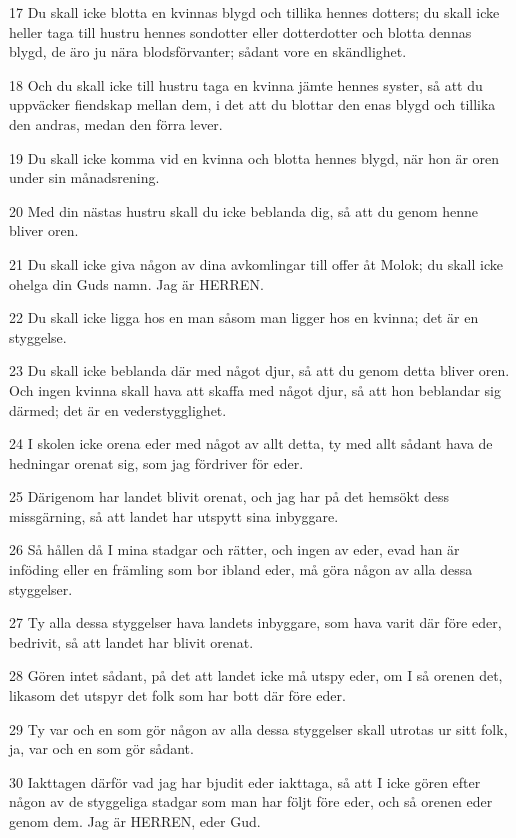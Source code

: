 \par 17 Du skall icke blotta en kvinnas blygd och tillika hennes dotters; du skall icke heller taga till hustru hennes sondotter eller dotterdotter och blotta dennas blygd, de äro ju nära blodsförvanter; sådant vore en skändlighet.
\par 18 Och du skall icke till hustru taga en kvinna jämte hennes syster, så att du uppväcker fiendskap mellan dem, i det att du blottar den enas blygd och tillika den andras, medan den förra lever.
\par 19 Du skall icke komma vid en kvinna och blotta hennes blygd, när hon är oren under sin månadsrening.
\par 20 Med din nästas hustru skall du icke beblanda dig, så att du genom henne bliver oren.
\par 21 Du skall icke giva någon av dina avkomlingar till offer åt Molok; du skall icke ohelga din Guds namn. Jag är HERREN.
\par 22 Du skall icke ligga hos en man såsom man ligger hos en kvinna; det är en styggelse.
\par 23 Du skall icke beblanda där med något djur, så att du genom detta bliver oren. Och ingen kvinna skall hava att skaffa med något djur, så att hon beblandar sig därmed; det är en vederstygglighet.
\par 24 I skolen icke orena eder med något av allt detta, ty med allt sådant hava de hedningar orenat sig, som jag fördriver för eder.
\par 25 Därigenom har landet blivit orenat, och jag har på det hemsökt dess missgärning, så att landet har utspytt sina inbyggare.
\par 26 Så hållen då I mina stadgar och rätter, och ingen av eder, evad han är inföding eller en främling som bor ibland eder, må göra någon av alla dessa styggelser.
\par 27 Ty alla dessa styggelser hava landets inbyggare, som hava varit där före eder, bedrivit, så att landet har blivit orenat.
\par 28 Gören intet sådant, på det att landet icke må utspy eder, om I så orenen det, likasom det utspyr det folk som har bott där före eder.
\par 29 Ty var och en som gör någon av alla dessa styggelser skall utrotas ur sitt folk, ja, var och en som gör sådant.
\par 30 Iakttagen därför vad jag har bjudit eder iakttaga, så att I icke gören efter någon av de styggeliga stadgar som man har följt före eder, och så orenen eder genom dem. Jag är HERREN, eder Gud.

